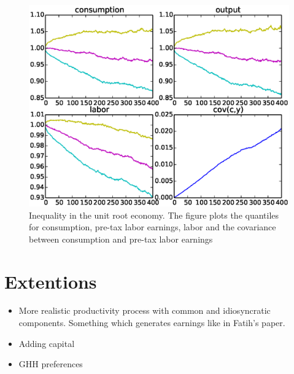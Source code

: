 \documentclass[thmsb,11pt]{article}
\begin{document}
  \begin{figure}[htp]
 \centering
 \includegraphics[width=\textwidth]{quant_pers.eps}
 \caption{Inequality in the unit root  economy. The figure plots the quantiles for consumption, pre-tax labor earnings, labor and the covariance between consumption and pre-tax labor earnings}
 \label{fig:quant_pers}
 \end{figure}




\section{Extentions}

  \begin{itemize}
  \item More realistic productivity process with common and idiosyncratic components. Something which generates earnings like in Fatih's paper.
  \item Adding capital 
  \item GHH preferences
  \end{itemize}
\end{document}
